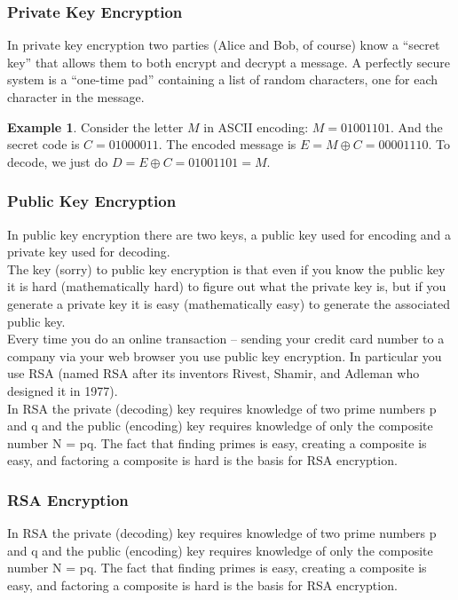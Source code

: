 \documentclass{book}
\theoremstyle{definition}
\newtheorem{exmp}{Example}[section]
\begin{document}
\subsubsection{Private Key Encryption} 
In private key encryption two parties (Alice and Bob, of course)
know a ``secret key'' that allows them to both encrypt and
decrypt a message.  A perfectly secure system is a ``one-time pad'' containing a list of random characters, one for each character in the message. 

\begin{exmp}
	Consider the letter $M$ in ASCII encoding: $M = 0100 1101$. And the secret code is $C = 0100 0011$. The encoded message is $E = M \oplus C = 0000 1110$. To decode, we just do $D = E\oplus C = 0100 1101 = M$. 
\end{exmp}


\subsubsection{Public Key Encryption}
In public key encryption there are two keys, a public key used
for encoding and a private key used for decoding. \\

The key (sorry) to public key encryption is that even if you know
the public key it is hard (mathematically hard) to figure out what
the private key is, but if you generate a private key it is easy
(mathematically easy) to generate the associated public key.\\

Every time you do an online transaction – sending your credit card
number to a company via your web browser you use public key
encryption. In particular you use RSA (named RSA after its inventors
Rivest, Shamir, and Adleman who designed it in 1977).\\

In RSA the private (decoding) key requires knowledge of two
prime numbers p and q and the public (encoding) key requires
knowledge of only the composite number N = pq. The fact that
finding primes is easy, creating a composite is easy, and
factoring a composite is hard is the basis for RSA encryption.



\subsubsection{RSA Encryption}
In RSA the private (decoding) key requires knowledge of two
prime numbers p and q and the public (encoding) key requires
knowledge of only the composite number N = pq. The fact that
finding primes is easy, creating a composite is easy, and
factoring a composite is hard is the basis for RSA encryption.\\
\end{document}
